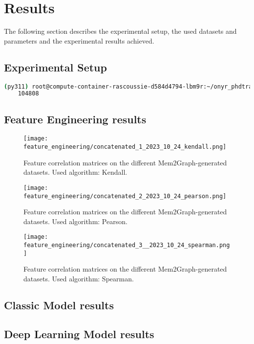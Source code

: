 \chapter{Results}\label{chap:results}

The following section describes the experimental setup, the used datasets and parameters and the experimental results achieved.

\section{Experimental Setup}



\begin{lstlisting}[language=bash, caption={Command used to count the number of .gv memory graph files generated by \textit{mem2graph} inside one of the servers mem2graph dataset directory.}]
    (py311) root@compute-container-rascoussie-d584d4794-lbm9r:~/onyr_phdtrack/mem2graph# find data/ -type f -name "*.gv" | wc -l
    104808
\end{lstlisting}

\section{Feature Engineering results}

\begin{figure}[H]\label{results:corr_matrices:kendall}
    \centering
    \texttt{[image: feature\_engineering/concatenated\_1\_2023\_10\_24\_kendall.png]}
    \caption{Feature correlation matrices on the different Mem2Graph-generated datasets. Used algorithm: Kendall.}
\end{figure}

\begin{figure}[H]\label{results:corr_matrices:pearson}
    \centering
    \texttt{[image: feature\_engineering/concatenated\_2\_2023\_10\_24\_pearson.png]}
    \caption{Feature correlation matrices on the different Mem2Graph-generated datasets. Used algorithm: Pearson.}
\end{figure}

\begin{figure}[H]\label{results:corr_matrices:spearman}
    \centering
    \texttt{[image: feature\_engineering/concatenated\_3\_\_2023\_10\_24\_spearman.png]}
    \caption{Feature correlation matrices on the different Mem2Graph-generated datasets. Used algorithm: Spearman.}
\end{figure}

\section{Classic Model results}

\section{Deep Learning Model results}


